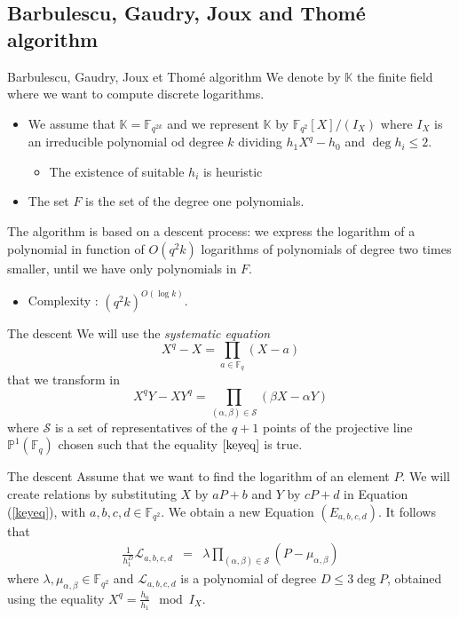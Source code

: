 \documentclass[xcolor=x11names,compress]{beamer}
\theoremstyle{break}
\theoremstyle{sc}
\theoremstyle{definition}
\theoremstyle{remark}
\begin{document}
\subsection{Barbulescu, Gaudry, Joux and Thomé algorithm}

\begin{frame}{Barbulescu, Gaudry, Joux et Thomé algorithm}
  We denote by $\mathbb{K}$ the finite field where we want to compute discrete
  logarithms.
  \begin{itemize}
    \item We assume that $\mathbb{K}=\mathbb{F}_{q^{2k}}$ and we represent
      $\mathbb{K}$ by $\mathbb{F}_{q^2}[X]/(I_X)$ where $I_X$ is an irreducible
      polynomial od degree $k$ dividing $h_1X^q-h_0$ and $\deg h_i\leq 2$.
      \begin{itemize}
        \item The existence of suitable $h_i$ is heuristic
      \end{itemize}
    \item The set $F$ is the set of the degree one polynomials.
\end{itemize}

The algorithm is based on a descent process: we express the logarithm of a
polynomial in function of $O(q^2k)$ logarithms of polynomials of degree two
times smaller, until we have only polynomials in $F$.
    \begin{itemize}
      \item Complexity : $(q^2k)^{O(\log k)}$.
    \end{itemize}

\end{frame}

\begin{frame}{The descent}
  We will use the \emph{systematic equation}
 \[
   X^q - X = \prod_{a\in\mathbb{F}_q}(X-a)
 \]
 that we transform in
 \begin{equation}
   X^qY - XY^q = \prod_{(\alpha, \beta)\in\mathcal S}(\beta X - \alpha Y)
   \label{keyeq}
 \end{equation}
 where $\mathcal S$ is a set of representatives of the $q+1$ points of the
 projective line $\mathbb{P}^1(\mathbb{F}_q)$ chosen such that the equality
 $\ref{keyeq}$ is true.
\end{frame}

\begin{frame}{The descent}
  Assume that we want to find the logarithm of an element $P$. We will create
  relations by substituting $X$ by $aP + b$ and $Y$ by $cP + d$ in Equation
  (\ref{keyeq}), with $a, b, c, d \in \mathbb{F}_{q^2}$. We obtain a new
  Equation $(E_{a, b, c, d})$. It follows that
  \begin{eqnarray*}
    \frac{1}{h_1^D}\mathcal L_{a, b, c, d} &=& \lambda \prod_{(\alpha, \beta)\in\mathcal S}(P-\mu_{\alpha, \beta})
  \end{eqnarray*}
  where $\lambda, \mu_{\alpha, \beta}\in\mathbb{F}_{q^2}$ and $\mathcal L_{a, b, c,
  d}$ is a polynomial of degree $D\leq 3\deg P$, obtained using the equality $X^q =
  \frac{h_0}{h_1}\mod I_X$.
  
\end{frame}
\end{document}
